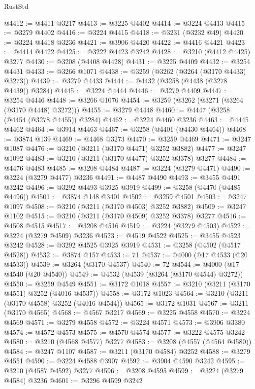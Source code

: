 \begin{lexlean}{RustStd}
\begin{coremodule}
@4412 := @4411 @3217
@4413 := @3225 @4402
@4414 := @3224 @4413
@4415 := @3279 @4402
@4416 := @3224 @4415
@4418 := @3231 (@3232 @49)
@4420 := @3224 @4418 @3236
@4421 := @3906 @4420
@4422 := @4416 @4421
@4423 := @4414 @4422
@4425 := @3222 @4423 @3242
@4428 := @3210 (@4412 @4425) @3277
@4430 := @3208 (@4408 @4428)
@4431 := @3225 @4409
@4432 := @3254 @4431
@4433 := @3266 @1071
@4438 := @3259 (@3262 (@3264 (@3170 @4433) @3273))
@4439 := @3279 @4433
@4444 := @4432 (@3258 (@4438 (@3278 @4439)) @3284)
@4445 := @3224 @4444
@4446 := @3279 @4409
@4447 := @3254 @4446
@4448 := @3266 @1076
@4454 := @3259 (@3262 (@3271 (@3264 (@3170 @4448) @3272)))
@4455 := @3279 @4448
@4460 := @4447 (@3258 (@4454 (@3278 @4455)) @3284)
@4462 := @3224 @4460 @3236
@4463 := @4445 @4462
@4464 := @3914 @4463
@4467 := @3258 (@4401 (@4430 @4464))
@4468 := @3874 @139
@4469 := @4468 @3273
@4470 := @3259 @4469
@4471 := @3247 @1087
@4476 := @3210 (@3211 (@3170 @4471) @3252 @3882)
@4477 := @3247 @1092
@4483 := @3210 (@3211 (@3170 @4477) @3252 @3378) @3277
@4484 := @4476 @4483
@4485 := @3208 @4484
@4487 := @3224 (@3279 @4471)
@4490 := @3224 (@3279 @4477) @3236
@4491 := @4487 @4490
@4493 := @3455 @4491 @3242
@4496 := @3292 @4493 @3925 @3919
@4499 := @3258 (@4470 (@4485 @4496))
@4501 := @3874 @148 @3401
@4502 := @3259 @4501
@4503 := @3247 @1097
@4508 := @3210 (@3211 (@3170 @4503) @3252 @3882)
@4509 := @3247 @1102
@4515 := @3210 (@3211 (@3170 @4509) @3252 @3378) @3277
@4516 := @4508 @4515
@4517 := @3208 @4516
@4519 := @3224 (@3279 @4503)
@4522 := @3224 (@3279 @4509) @3236
@4523 := @4519 @4522
@4525 := @3455 @4523 @3242
@4528 := @3292 @4525 @3925 @3919
@4531 := @3258 (@4502 (@4517 @4528))
@4532 := @3874 @157
@4533 := 71
@4537 := @4000 (@17 @4533 (@20 @4533))
@4539 := @3264 (@3170 @4537)
@4540 := 72
@4544 := @4000 (@17 @4540 (@20 @4540))
@4549 := @4532 (@4539 (@3264 (@3170 @4544) @3272))
@4550 := @3259 @4549
@4551 := @3172 @1018
@4557 := @3210 (@3211 (@3170 @4551) @3252 (@4016 @4537))
@4558 := @3172 @1023
@4564 := @3210 (@3211 (@3170 @4558) @3252 (@4016 @4544))
@4565 := @3172 @1031
@4567 := @3211 (@3170 @4565)
@4568 := @4567 @3217
@4569 := @3225 @4558
@4570 := @3224 @4569
@4571 := @3279 @4558
@4572 := @3224 @4571
@4573 := @3906 @3380
@4574 := @4572 @4573
@4575 := @4570 @4574
@4577 := @3222 @4575 @3242
@4580 := @3210 (@4568 @4577) @3277
@4583 := @3208 (@4557 (@4564 @4580))
@4584 := @3247 @1107
@4587 := @3211 (@3170 @4584) @3252
@4588 := @3279 @4551
@4590 := @3224 @4588 @3907
@4592 := @3904 @4590 @3242
@4595 := @3210 (@4587 @4592) @3277
@4596 := @3208 @4595
@4599 := @3224 (@3279 @4584) @3236
@4601 := @3296 @4599 @3242

\end{coremodule}
\end{lexlean}

